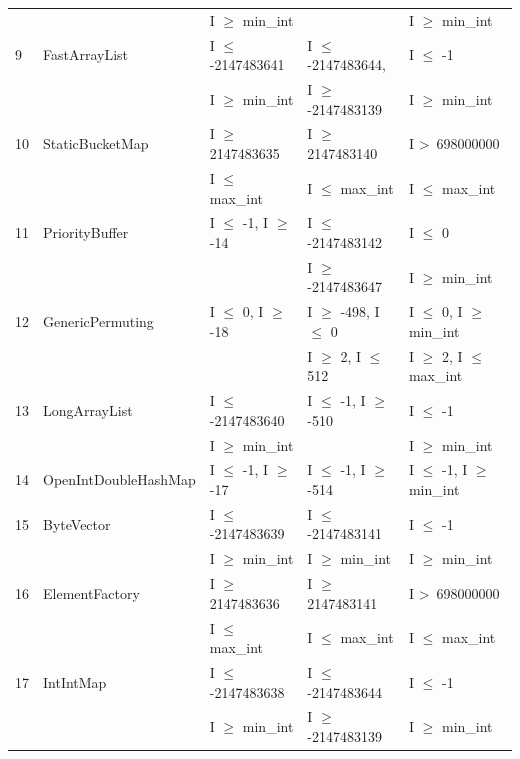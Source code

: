{\begin{longtable}{|l|l|l|l|l|}
	&                                             & I $\ge$ min\_int					& 								& I $\ge$ min\_int				\\	
9	& FastArrayList				& I $\le$ -2147483641 			& I $\le$ -2147483644, 			& I $\le$ -1								\\ 
	&                                             & I $\ge$ min\_int					& I $\ge$ -2147483139			& I $\ge$ min\_int				\\	
10	& StaticBucketMap			& I $\ge$ 2147483635			& I $\ge$ 2147483140			& I \textgreater~698000000					\\ 
	&                                             & I $\le$ max\_int					& I $\le$ max\_int					& I $\le$ max\_int			   		\\	
11	& PriorityBuffer				& I $\le$ -1, I $\ge$ -14			& I $\le$  -2147483142			& I $\le$ 0								\\
	&                                             & 								& I $\ge$ -2147483647			& I $\ge$ min\_int			   	\\	 
12	& GenericPermuting			& I $\le$ 0, I $\ge$ -18			& I $\ge$ -498, I $\le$ 0			& I $\le$ 0, I $\ge$ min\_int	\\ 	%
	&                                             & 								& I $\ge$ 2, I $\le$ 512			& I $\ge$ 2, I $\le$ max\_int	\\
13	& LongArrayList				& I $\le$ -2147483640			& I $\le$ -1, I $\ge$ -510			& I $\le$ -1								\\ 
	&                                             & I $\ge$ min\_int					& 								& I $\ge$ min\_int				\\
14	& OpenIntDoubleHashMap	& I $\le$ -1, I $\ge$ -17			& I $\le$ -1, I $\ge$ -514			& I $\le$ -1, I $\ge$ min\_int	\\ 
15	& ByteVector					& I $\le$ -2147483639			& I $\le$ -2147483141			& I $\le$ -1								\\ 	%
	&                                             & I $\ge$ min\_int					& I $\ge$ min\_int				& I $\ge$ min\_int				\\	
16	& ElementFactory				& I $\ge$ 2147483636			& I $\ge$ 2147483141			& I \textgreater~698000000					\\ 
	&                                             & I $\le$ max\_int					& I $\le$ max\_int					& I $\le$ max\_int						\\	
17	& IntIntMap					& I $\le$ -2147483638			& I $\le$ -2147483644			& I $\le$ -1								\\ 
	&                                             & I $\ge$ min\_int					& I $\ge$ -2147483139			& I $\ge$ min\_int 				\\	

\end{longtable}}
